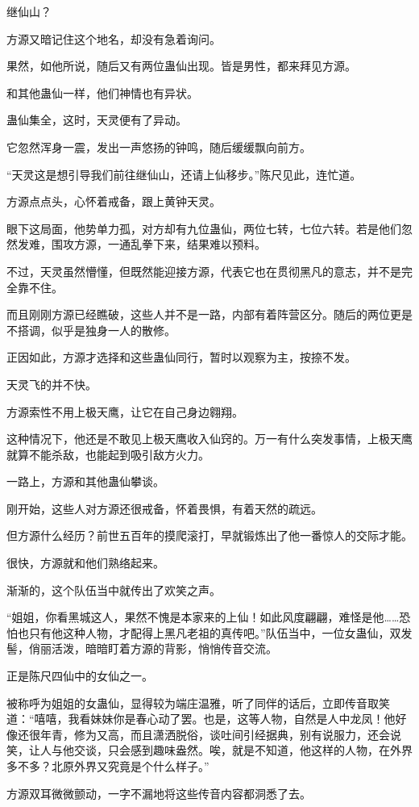 \begin{this_body}
继仙山？

方源又暗记住这个地名，却没有急着询问。

果然，如他所说，随后又有两位蛊仙出现。皆是男性，都来拜见方源。

和其他蛊仙一样，他们神情也有异状。

蛊仙集全，这时，天灵便有了异动。

它忽然浑身一震，发出一声悠扬的钟鸣，随后缓缓飘向前方。

“天灵这是想引导我们前往继仙山，还请上仙移步。”陈尺见此，连忙道。

方源点点头，心怀着戒备，跟上黄钟天灵。

眼下这局面，他势单力孤，对方却有九位蛊仙，两位七转，七位六转。若是他们忽然发难，围攻方源，一通乱拳下来，结果难以预料。

不过，天灵虽然懵懂，但既然能迎接方源，代表它也在贯彻黑凡的意志，并不是完全靠不住。

而且刚刚方源已经瞧破，这些人并不是一路，内部有着阵营区分。随后的两位更是不搭调，似乎是独身一人的散修。

正因如此，方源才选择和这些蛊仙同行，暂时以观察为主，按捺不发。

天灵飞的并不快。

方源索性不用上极天鹰，让它在自己身边翱翔。

这种情况下，他还是不敢见上极天鹰收入仙窍的。万一有什么突发事情，上极天鹰就算不能杀敌，也能起到吸引敌方火力。

一路上，方源和其他蛊仙攀谈。

刚开始，这些人对方源还很戒备，怀着畏惧，有着天然的疏远。

但方源什么经历？前世五百年的摸爬滚打，早就锻炼出了他一番惊人的交际才能。

很快，方源就和他们熟络起来。

渐渐的，这个队伍当中就传出了欢笑之声。

“姐姐，你看黑城这人，果然不愧是本家来的上仙！如此风度翩翩，难怪是他……恐怕也只有他这种人物，才配得上黑凡老祖的真传吧。”队伍当中，一位女蛊仙，双发髻，俏丽活泼，暗暗盯着方源的背影，悄悄传音交流。

正是陈尺四仙中的女仙之一。

被称呼为姐姐的女蛊仙，显得较为端庄温雅，听了同伴的话后，立即传音取笑道：“嘻嘻，我看妹妹你是春心动了罢。也是，这等人物，自然是人中龙凤！他好像还很年青，修为又高，而且潇洒脱俗，谈吐间引经据典，别有说服力，还会说笑，让人与他交谈，只会感到趣味盎然。唉，就是不知道，他这样的人物，在外界多不多？北原外界又究竟是个什么样子。”

方源双耳微微颤动，一字不漏地将这些传音内容都洞悉了去。


\end{this_body}
